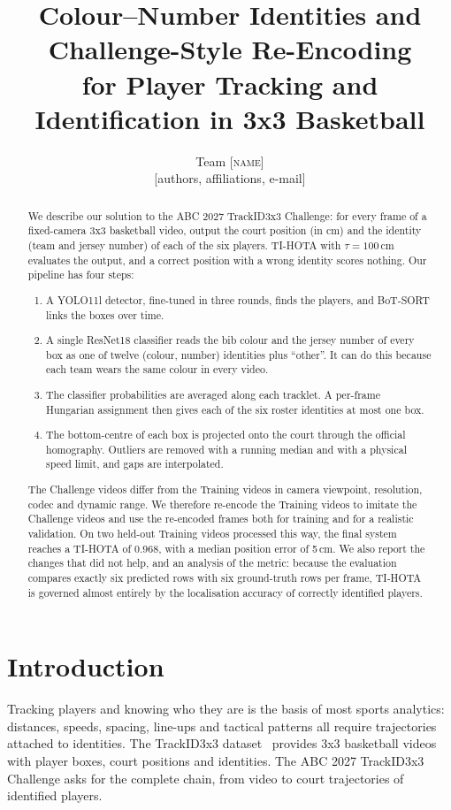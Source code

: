 \documentclass[11pt,a4paper]{article}
\title{Colour--Number Identities and Challenge-Style Re-Encoding\\for Player Tracking and Identification in 3x3 Basketball}
\author{Team \textsc{[name]} \\ \small [authors, affiliations, e-mail]}
\date{}
\begin{document}
\maketitle

\begin{abstract}
We describe our solution to the ABC 2027 TrackID3x3 Challenge: for every frame of a fixed-camera 3x3
basketball video, output the court position (in cm) and the identity (team and jersey number) of each
of the six players. TI-HOTA with $\tau = 100$\,cm evaluates the output, and a correct position with a wrong
identity scores nothing. Our pipeline has four steps:
\begin{enumerate}
\item A YOLO11l detector, fine-tuned in three rounds, finds the players, and BoT-SORT links the boxes over time.
\item A single ResNet18 classifier reads the bib colour and the jersey number of every box as one of
twelve (colour, number) identities plus ``other''. It can do this because each team wears the same
colour in every video.
\item The classifier probabilities are averaged along each tracklet. A per-frame Hungarian assignment
then gives each of the six roster identities at most one box.
\item The bottom-centre of each box is projected onto the court through the official homography.
Outliers are removed with a running median and with a physical speed limit, and gaps are interpolated.
\end{enumerate}
The Challenge videos differ from the Training videos in camera viewpoint, resolution, codec and dynamic
range. We therefore re-encode the Training videos to imitate the Challenge videos and use the
re-encoded frames both for training and for a realistic validation. On two held-out Training videos
processed this way, the final system reaches a TI-HOTA of 0.968, with a median position error of
5\,cm. We also report the changes that did not help, and an analysis of the metric: because the
evaluation compares exactly six predicted rows with six ground-truth rows per frame, TI-HOTA is
governed almost entirely by the localisation accuracy of correctly identified players.
\end{abstract}

\section{Introduction}
Tracking players and knowing who they are is the basis of most sports analytics: distances, speeds,
spacing, line-ups and tactical patterns all require trajectories attached to identities. The TrackID3x3
dataset~\cite{trackid3x3} provides 3x3 basketball videos with player boxes, court positions and
identities. The ABC 2027 TrackID3x3 Challenge asks for the complete chain, from video to court
trajectories of identified players.
\end{document}
